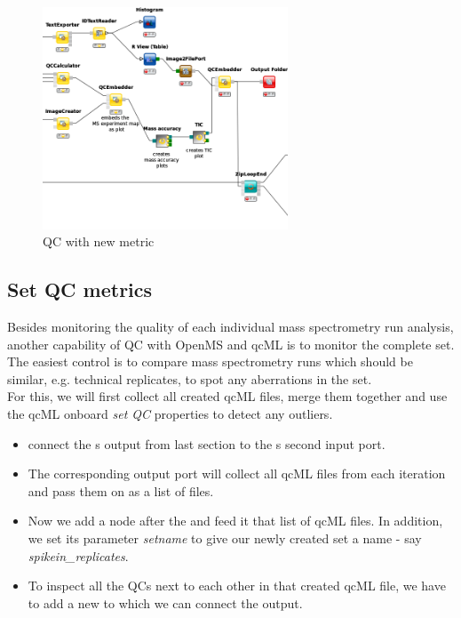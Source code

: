 \begin{figure}[htbp]
  \centering
  \includegraphics[width=0.65\textwidth]{graphics/qc/qc_extra}
  \caption{QC with new metric}
  \label{fig:qc_extra}
\end{figure}

\newpage
\subsection{Set QC metrics}
\label{Set QC metrics}

Besides monitoring the quality of each individual mass spectrometry run analysis, another capability of QC with OpenMS and qcML is to monitor the complete set. The easiest control is to compare mass spectrometry runs which should be similar, e.g. technical replicates, to spot any aberrations in the set.\\
For this, we will first collect all created qcML files, merge them together and use the qcML onboard \textit{set QC} properties to detect any outliers.

\begin{itemize}
\item connect the s output from last section to the s second input port. 
\item The corresponding output port will collect all qcML files from each  iteration and pass them on as a list of files.
\item Now we add a  node after the  and feed it that list of qcML files. In addition, we set its parameter \textit{setname} to give our newly created set a name - say \textit{spikein\_replicates}.
\item To inspect all the QCs next to each other in that created qcML file, we have to add a new  to which we can connect the  output.
\end{itemize}

